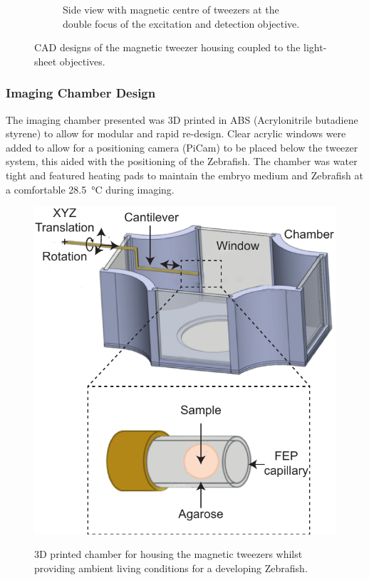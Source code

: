 \begin{figure}[t!]
\begin{subfigure}[t]{0.45\textwidth}
        \caption{Side view with magnetic centre of tweezers at the double focus of the excitation and detection objective.}
    \end{subfigure}
    \caption{CAD designs of the magnetic tweezer housing coupled to the light-sheet objectives.}
\end{figure}
\subsubsection{Imaging Chamber Design}

The imaging chamber presented was 3D printed in ABS (Acrylonitrile butadiene styrene) to allow for modular and rapid re-design.
Clear acrylic windows were added to allow for a positioning camera (PiCam) to be placed below the tweezer system, this aided with the positioning of the Zebrafish.
The chamber was water tight and featured heating pads to maintain the embryo medium and Zebrafish at a comfortable \SI{28.5}{\celsius} during imaging.

\begin{figure}
  \centering
  \includegraphics{Chapters/tweezers/Figs/PDF/fep_chamber}
  \label{fig:fep_chamber}
  \caption{3D printed chamber for housing the magnetic tweezers whilst providing ambient living conditions for a developing Zebrafish.}
\end{figure}

